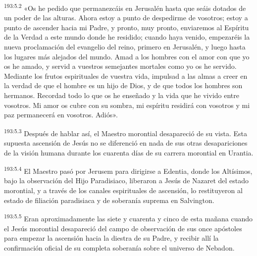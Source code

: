 \par 
\textsuperscript{193:5.2} «Os he pedido que permanezcáis en Jerusalén hasta que seáis dotados de un poder de las alturas. Ahora estoy a punto de despedirme de vosotros; estoy a punto de ascender hacia mi Padre, y pronto, muy pronto, enviaremos al Espíritu de la Verdad a este mundo donde he residido; cuando haya venido, empezaréis la nueva proclamación del evangelio del reino, primero en Jerusalén, y luego hasta los lugares más alejados del mundo. Amad a los hombres con el amor con que yo os he amado, y servid a vuestros semejantes mortales como yo os he servido. Mediante los frutos espirituales de vuestra vida, impulsad a las almas a creer en la verdad de que el hombre es un hijo de Dios, y de que todos los hombres son hermanos. Recordad todo lo que os he enseñado y la vida que he vivido entre vosotros. Mi amor os cubre con su sombra, mi espíritu residirá con vosotros y mi paz permanecerá en vosotros. Adiós».

\par 
\textsuperscript{193:5.3} Después de hablar así, el Maestro morontial desapareció de su vista. Esta supuesta ascensión de Jesús no se diferenció en nada de sus otras desapariciones de la visión humana durante los cuarenta días de su carrera morontial en Urantia.

\par 
\textsuperscript{193:5.4} El Maestro pasó por Jerusem para dirigirse a Edentia, donde los Altísimos, bajo la observación del Hijo Paradisiaco, liberaron a Jesús de Nazaret del estado morontial, y a través de los canales espirituales de ascensión, lo restituyeron al estado de filiación paradisiaca y de soberanía suprema en Salvington.

\par 
\textsuperscript{193:5.5} Eran aproximadamente las siete y cuarenta y cinco de esta mañana cuando el Jesús morontial desapareció del campo de observación de sus once apóstoles para empezar la ascensión hacia la diestra de su Padre, y recibir allí la confirmación oficial de su completa soberanía sobre el universo de Nebadon.

